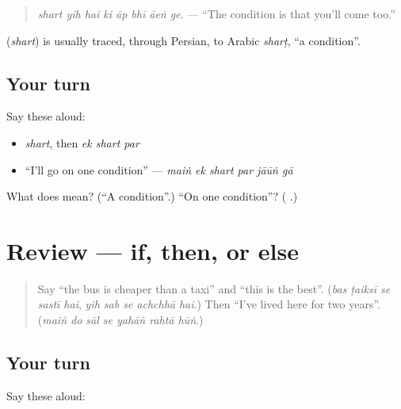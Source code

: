 \begin{quote}
\emph{shart yih hai ki āp bhī āeṅ ge.} — \textquotedblleft{}The condition is that you'll come too.\textquotedblright{}
\end{quote}

\begin{cousinweb}
\textbf{} (\emph{shart}) is usually traced, through Persian, to Arabic \emph{sharṭ}, \textquotedblleft{}a condition\textquotedblright{}.
\end{cousinweb}

\subsection*{Your turn}
Say these aloud:

\begin{itemize}
\raggedright
  \item \emph{shart}, then \emph{ek shart par}
  \item \textquotedblleft{}I'll go on one condition\textquotedblright{} — \emph{maiṅ ek shart par jāūṅ gā}
\end{itemize}

\begin{tcolorbox}[breakable,colback=teal!4,colframe=teal!35!black,title={Before you move on}]
What does \textbf{} mean? (\textquotedblleft{}A condition\textquotedblright{}.) \textquotedblleft{}On one condition\textquotedblright{}? (\textbf{  }.)
\end{tcolorbox}
\section[(review)]{Review — if, then, or else}

\label{lesson:UR-R274-if-and-otherwise}



\begin{quote}
Say \textquotedblleft{}the bus is cheaper than a taxi\textquotedblright{} and \textquotedblleft{}this is the best\textquotedblright{}. (\emph{bas ṭaiksī se sastī hai}, \emph{yih sab se achchhā hai}.) Then \textquotedblleft{}I've lived here for two years\textquotedblright{}. (\emph{maiṅ do sāl se yahāṅ rahtā hūṅ}.)
\end{quote}

\subsection*{Your turn}
Say these aloud:

